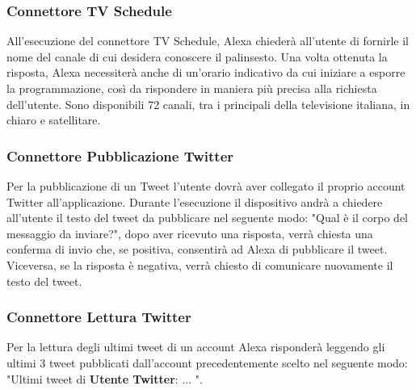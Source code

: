 \subsubsection{Connettore TV Schedule}
All'esecuzione del connettore TV Schedule, Alexa chiederà all'utente di fornirle il nome del canale di cui desidera conoscere il palinsesto. Una volta ottenuta la risposta, Alexa necessiterà anche di un'orario indicativo da cui iniziare a esporre la programmazione, così da rispondere in maniera più precisa alla richiesta dell'utente.
Sono disponibili 72 canali, tra i principali della televisione italiana, in chiaro e satellitare.
\subsubsection{Connettore Pubblicazione Twitter}
Per la pubblicazione di un Tweet l'utente dovrà aver collegato il proprio account Twitter all'applicazione.
Durante l'esecuzione il dispositivo andrà a chiedere all'utente il testo del tweet da pubblicare nel seguente modo: "Qual è il corpo del messaggio da inviare?", dopo aver ricevuto una risposta, verrà chiesta una conferma di invio che, se positiva, consentirà ad Alexa di pubblicare il tweet. Viceversa, se la risposta è negativa, verrà chiesto di comunicare nuovamente il testo del tweet.
\subsubsection{Connettore Lettura Twitter}
Per la lettura degli ultimi tweet di un account Alexa risponderà leggendo gli ultimi 3 tweet pubblicati dall'account precedentemente scelto nel seguente modo: "Ultimi tweet di \textbf{Utente Twitter}: ... ".
